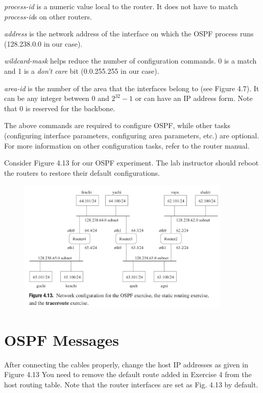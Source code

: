 \documentclass{../UTNetLab}
\begin{document}
    \textit{process-id} is a numeric value local to the router.
    It does not have to match \textit{process-id}s on other routers.

    \textit{address} is the network address of the interface on which the OSPF process runs (128.238.0.0 in our case).

    \textit{wildcard-mask} helps reduce the number of configuration commands.
    0 is a match and 1 is a \textit{don’t care} bit (0.0.255.255 in our case).

    \textit{area-id} is the number of the area that the interfaces belong to (see Figure 4.7).
    It can be any integer between 0 and $2^{32} - 1$ or can have an IP address form.
    Note that 0 is reserved for the backbone. 

    The above commands are required to configure OSPF, while other tasks (configuring interface parameters, configuring area parameters, etc.) are optional.
    For more information on other configuration tasks, refer to the router manual. 

    Consider Figure 4.13 for our OSPF experiment.
    The lab instructor should reboot the routers to restore their default configurations.
    \begin{figure}[H]
        \centering
        \includegraphics[width=0.9\textwidth]{img/figure4-13.png}
    \end{figure}

\section{OSPF Messages}
    After connecting the cables properly, change the host IP addresses as given in Figure 4.13 You need to remove the default route added in Exercise 4 from the host routing table.
    Note that the router interfaces are set as Fig. 4.13 by default. 
\end{document}
